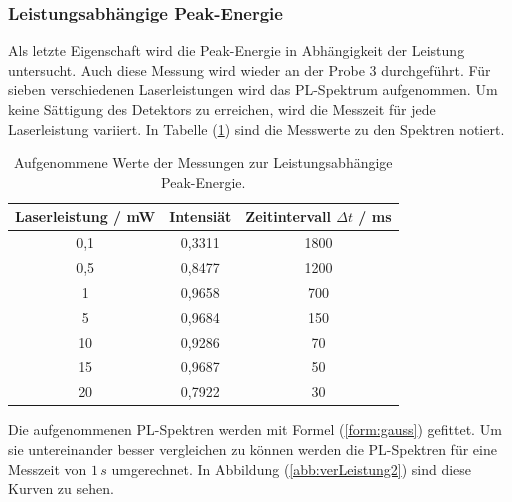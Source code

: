 \subsubsection{Leistungsabh\"{a}ngige Peak-Energie}
Als letzte Eigenschaft wird die Peak-Energie in Abh\"{a}ngigkeit der Leistung untersucht.
Auch diese Messung wird wieder an der Probe 3 durchgef\"{u}hrt.
F\"{u}r sieben verschiedenen Laserleistungen wird das PL-Spektrum aufgenommen.
Um keine S\"{a}ttigung des Detektors zu erreichen, wird die Messzeit f\"{u}r jede Laserleistung variiert.
In Tabelle (\ref{tab:1c}) sind die Messwerte zu den Spektren notiert.
\begin{table}
	\centering
	\caption{Aufgenommene Werte der Messungen zur Leistungsabh\"{a}ngige Peak-Energie.}
\begin{tabular}{|ccc|}
	\hline
	{Laserleistung / mW} & {Intensi\"{a}t} & {Zeitintervall $\Delta t$ / ms} \\
	\hline
	0,1	&	0,3311	&	1800	\\
	0,5	&	0,8477	&	1200	\\
	1	&	0,9658	&	700	\\
	5	&	0,9684	&	150	\\
	10	&	0,9286	&	70	\\
	15	&	0,9687	&	50	\\
	20	&	0,7922	&	30	\\
	\hline
\end{tabular}
\label{tab:1c}
\end{table}
Die aufgenommenen PL-Spektren werden mit Formel (\ref{form:gauss}) gefittet.
Um sie untereinander besser vergleichen zu k\"{o}nnen werden die PL-Spektren f\"{u}r eine Messzeit von $1 \, s$ umgerechnet.
In Abbildung (\ref{abb:verLeistung2}) sind diese Kurven zu sehen.
